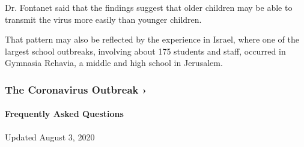 Dr. Fontanet said that the findings suggest that older children may be
able to transmit the virus more easily than younger children.

That pattern may also be reflected by the experience in Israel, where
one of the largest school outbreaks, involving about 175 students and
staff, occurred in Gymnasia Rehavia, a middle and high school in
Jerusalem.

\href{https://www.nytimes3xbfgragh.onion/news-event/coronavirus?action=click\&pgtype=Article\&state=default\&region=MAIN_CONTENT_3\&context=storylines_faq}{}

\hypertarget{the-coronavirus-outbreak-}{%
\subsubsection{The Coronavirus Outbreak
›}\label{the-coronavirus-outbreak-}}

\hypertarget{frequently-asked-questions}{%
\paragraph{Frequently Asked
Questions}\label{frequently-asked-questions}}

Updated August 3, 2020

